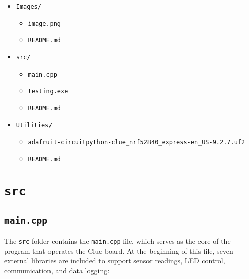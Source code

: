 \documentclass[12pt]{report}
\begin{document}
\begin{itemize}
\begin{itemize}
\begin{itemize}
      \end{itemize}
      \item \texttt{Images/}
      \begin{itemize}
        \item \texttt{image.png}
        \item \texttt{README.md}
      \end{itemize}
      \item \texttt{src/}
      \begin{itemize}
        \item \texttt{main.cpp}
        \item \texttt{testing.exe}
        \item \texttt{README.md}
      \end{itemize}
      \item \texttt{Utilities/}
      \begin{itemize}
        \item \texttt{adafruit-circuitpython-clue\_nrf52840\_express-en\_US-9.2.7.uf2}
        \item \texttt{README.md}
      \end{itemize}
    \end{itemize}
\end{itemize}

\section{\texttt{src}}

\subsection{\texttt{main.cpp}}

The \texttt{src} folder contains the \texttt{main.cpp} file, which serves as the core of the program that operates the Clue board. At the beginning of this file, seven external libraries are included to support sensor readings, LED control, communication, and data logging:
\end{document}
